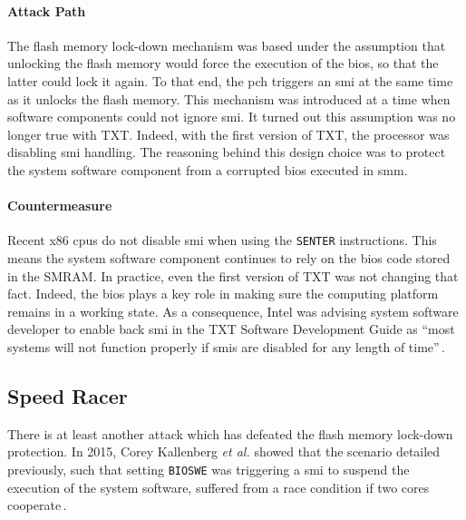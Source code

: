 \paragraph{Attack Path}
%
The flash memory lock-down mechanism was based under the assumption that
unlocking the flash memory would force the execution of the \ac{bios}, so that
the latter could lock it again.
%
To that end, the \ac{pch} triggers an \ac{smi} at the same time as it unlocks
the flash memory.
%
This mechanism was introduced at a time when software components could not
ignore \ac{smi}.
%
It turned out this assumption was no longer true with TXT.
%
Indeed, with the first version of TXT, the processor was disabling \ac{smi}
handling.
%
The reasoning behind this design choice was to protect the system software
component from a corrupted \ac{bios} executed in \ac{smm}.

\paragraph{Countermeasure}
%
Recent x86 \acp{cpu} do not disable \ac{smi} when using the \texttt{SENTER}
instructions.
%
This means the system software component continues to rely on the \ac{bios} code
stored in the SMRAM.
%
In practice, even the first version of TXT was not changing that fact.
%
Indeed, the \ac{bios} plays a key role in making sure the computing platform
remains in a working state.
%
As a consequence, Intel was advising system software developer to enable back
\ac{smi} in the TXT Software Development Guide as ``most systems will not
function properly if \acp{smi} are disabled for any length of
time''\,\cite{intel2015txt}.

\subsection{Speed Racer}
\label{subsec:usecase:hse:speed}

There is at least another attack which has defeated the flash memory lock-down
protection.
%
In 2015, Corey Kallenberg \emph{et al.} showed that the scenario detailed
previously, such that setting \texttt{BIOSWE} was triggering a \ac{smi} to
suspend the execution of the system software, suffered from a race condition if
two cores cooperate\,\cite{kallenberg2015racecondition}.

